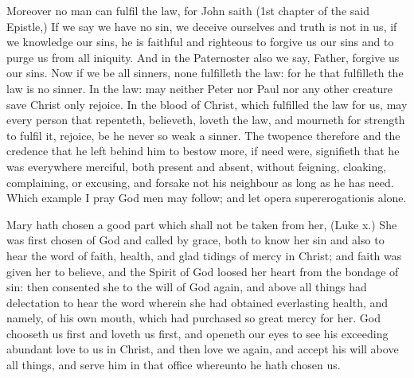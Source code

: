 Moreover no man can fulfil the law, for John saith (1st 
chapter of the said Epistle,) If we say we have no sin, we 
deceive ourselves and truth is not in us, if we knowledge 
our sins, he is faithful and righteous to forgive us our sins 
and to purge us from all iniquity. And in the Paternoster 
also we say, Father, forgive us our sins. Now if we be all 
sinners, none fulfilleth the law: for he that fulfilleth the law 
is no sinner. In the law: may neither Peter nor Paul nor 
any other creature save Christ only rejoice. In the blood 
of Christ, which fulfilled the law for us, may every person 
that repenteth, believeth, loveth the law, and mourneth for 
strength to fulfil it, rejoice, be he never so weak a sinner. 
The twopence therefore and the credence that he left behind
him to bestow more, if need were, signifieth that he 
was everywhere merciful, both present and absent, without 
feigning, cloaking, complaining, or excusing, and forsake not 
his neighbour as long as he has need. Which example I 
pray God men may follow; and let opera supererogationis 
alone. 


Mary hath chosen a good part which shall not be taken 
from her, (Luke x.) She was first chosen of God and called 
by grace, both to know her sin and also to hear the word 
of faith, health, and glad tidings of mercy in Christ; and 
faith was given her to believe, and the Spirit of God loosed 
her heart from the bondage of sin: then consented she to 
the will of God again, and above all things had delectation 
to hear the word wherein she had obtained everlasting health, 
and namely, of his own mouth, which had purchased so 
great mercy for her. God chooseth us first and loveth us 
first, and openeth our eyes to see his exceeding abundant 
love to us in Christ, and then love we again, and accept his 
will above all things, and serve him in that office whereunto 
he hath chosen us. 

